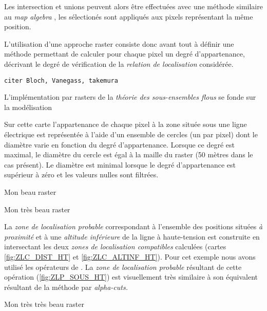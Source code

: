 Les intersection et unions peuvent alors être effectuées avec une
méthode similaire au \emph{map algebra} \autocite{XX}, les sélectionés
sont appliqués aux pixels représentant la même position.




L'utilisation d'une approche raster consiste donc avant tout à définir
une méthode permettant de calculer pour chaque pixel un degré
d'appartenance, décrivant le degré de vérification de la
\emph{relation de localisation} considérée.

\texttt{citer Bloch, Vanegass, takemura}

L'implémentation par rasters de la \emph{théorie des sous-ensembles
  flous} se fonde sur la modélisation


Sur cette carte l'appartenance de chaque pixel à la zone située sous
une ligne électrique est représentée à l'aide d'un ensemble de cercles
(un par pixel) dont le diamètre varie en fonction du degré
d'appartenance. Lorsque ce degré est maximal, le diamètre du cercle
est égal à la maille du raster (50 mètres dans le cas présent). Le
diamètre est minimal lorsque le degré d'appartenance est supérieur à
zéro et les valeurs nulles sont filtrées.

\begin{carte}
  \centering
  
  \caption{Mon beau raster}
  \label{fig:ZLC_DIST_HT}
\end{carte}


\begin{carte}
  \centering
  
  \caption{Mon très beau raster}
  \label{fig:ZLC_ALTINF_HT}
\end{carte}

La \emph{zone de localisation probable} correspondant à l'ensemble des
positions situées \emph{à proximité} et à une \emph{altitude
  inférieure} de la ligne à haute-tension est construite en
intersectant les deux \emph{zones de localisation compatibles}
calculées (cartes \ref{fig:ZLC_DIST_HT} et
\ref{fig:ZLC_ALTINF_HT}). Pour cet exemple nous avons utilisé les
opérateurs de \textcite{Zadeh1965}.
% 
La \emph{zone de localisation probable} résultant de cette opération
(\ref{fig:ZLP_SOUS_HT}) est visuellement très similaire à son
équivalent résultant de la méthode par \emph{alpha-cuts.}

\begin{carte}
  \centering
  
  \caption{Mon très très beau raster}
  \label{fig:ZLP_SOUS_HT}
\end{carte}



